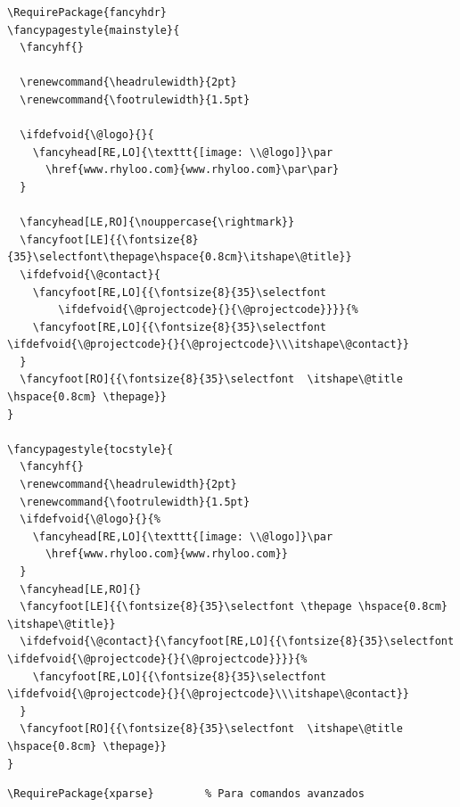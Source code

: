 \documentclass{reporti}
\begin{document}
\begin{verbatim}
\RequirePackage{fancyhdr}      
\fancypagestyle{mainstyle}{
  \fancyhf{}
  
  \renewcommand{\headrulewidth}{2pt}
  \renewcommand{\footrulewidth}{1.5pt}
  
  \ifdefvoid{\@logo}{}{
    \fancyhead[RE,LO]{\texttt{[image: \\@logo]}\par
      \href{www.rhyloo.com}{www.rhyloo.com}\par\par}
  }
  
  \fancyhead[LE,RO]{\nouppercase{\rightmark}}
  \fancyfoot[LE]{{\fontsize{8}{35}\selectfont\thepage\hspace{0.8cm}\itshape\@title}}
  \ifdefvoid{\@contact}{
    \fancyfoot[RE,LO]{{\fontsize{8}{35}\selectfont
        \ifdefvoid{\@projectcode}{}{\@projectcode}}}}{%
    \fancyfoot[RE,LO]{{\fontsize{8}{35}\selectfont \ifdefvoid{\@projectcode}{}{\@projectcode}\\\itshape\@contact}}
  }
  \fancyfoot[RO]{{\fontsize{8}{35}\selectfont  \itshape\@title \hspace{0.8cm} \thepage}}
}

\fancypagestyle{tocstyle}{
  \fancyhf{}
  \renewcommand{\headrulewidth}{2pt}
  \renewcommand{\footrulewidth}{1.5pt}
  \ifdefvoid{\@logo}{}{%
    \fancyhead[RE,LO]{\texttt{[image: \\@logo]}\par
      \href{www.rhyloo.com}{www.rhyloo.com}}
  }
  \fancyhead[LE,RO]{}
  \fancyfoot[LE]{{\fontsize{8}{35}\selectfont \thepage \hspace{0.8cm} \itshape\@title}}
  \ifdefvoid{\@contact}{\fancyfoot[RE,LO]{{\fontsize{8}{35}\selectfont \ifdefvoid{\@projectcode}{}{\@projectcode}}}}{%
    \fancyfoot[RE,LO]{{\fontsize{8}{35}\selectfont \ifdefvoid{\@projectcode}{}{\@projectcode}\\\itshape\@contact}}
  }
  \fancyfoot[RO]{{\fontsize{8}{35}\selectfont  \itshape\@title \hspace{0.8cm} \thepage}}
}

\end{verbatim}

\begin{verbatim}
\RequirePackage{xparse}        % Para comandos avanzados
\end{verbatim}
\end{document}
